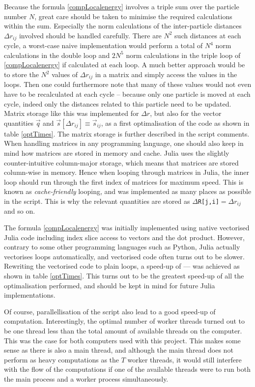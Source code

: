 \documentclass[a4paper,8pt]{article}
\begin{document}
\begin{multicols}{2}
Because the formula \eqref{compLocalenergy} involves a triple sum over the particle number $N$, great care should be taken to minimise the required calculations within the sum. Especially the norm calculations of the inter-particle distances $\Delta r_{ij}$ involved should be handled carefully. There are $N^2$ such distances at each cycle, a worst-case naive implementation would perform a total of $N^4$ norm calculations in the double loop and $2N^5$ norm calculations in the triple loop of \eqref{compLocalenergy} if calculated at each loop. A much better approach would be to store the $N^2$ values of $\Delta r_{ij}$ in a matrix and simply access the values in the loops. Then one could furthermore note that many of these values would not even have to be recalculated at each cycle -- because only one particle is moved at each cycle, indeed only the distances related to this particle need to be updated. Matrix storage like this was implemented for $\Delta r$, but also for the vector quantities $\vec{q}$ and $\vec{s}[\Delta r_{ij}] \equiv \vec{s}_{ij}$, as a first optimalisation of the code as shown in table \ref{optTimes}. The matrix storage is further described in the script comments. When handling matrices in any programming language, one should also keep in mind how matrices are stored in memory and cache. Julia uses the slightly counter-intuitive column-major storage, which means that matrices are stored column-wise in memory. Hence when looping through matrices in Julia, the inner loop should run through the first index of matrices for maximum speed. This is known as \textit{cache-friendly} looping, and was implemented as many places as possible in the script. This is why the relevant quantities are stored as \texttt{$\Delta$R[j,i]}$ = \Delta{r}_{ij}$ and so on.

The formula \eqref{compLocalenergy} was initially implemented using native vectorised Julia code including index slice access to vectors and the dot product. However, contrary to some other programming languages such as Python, Julia actually vectorises loops automatically, and vectorised code often turns out to be slower. Rewriting the vectorised code to plain loops, a speed-up of --- was achieved as shown in table \ref{optTimes}. This turns out to be the greatest speed-up of all the optimalisation performed, and should be kept in mind for future Julia implementations.

Of course, parallellisation of the script also lead to a good speed-up of computation. Interestingly, the optimal number of worker threads turned out to be one thread less than the total amount of available threads on the computer. This was the case for both computers used with this project. This makes some sense as there is also a main thread, and although the main thread does not perform as heavy computations as the $T$ worker threads, it would still interfere with the flow of the computations if one of the available threads were to run both the main process and a worker process simultaneously.


\end{multicols}
\end{document}
